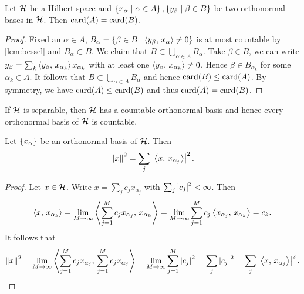 \begin{proposition}
    Let $\mathcal{H}$ be a Hilbert space and $\left\{ x_\alpha \;\middle\vert\; \alpha\in A \right\},\left\{ y_\beta \;\middle\vert\; \beta\in B \right\}$ 
    be two orthonormal bases in $\mathcal{H}$. Then $\operatorname{card}(A) = \operatorname{card}(B)$.
\end{proposition}
\begin{proof}
    Fixed an $\alpha\in A$, $B_\alpha = \left\{ \beta\in B \;\middle\vert\; \left\langle {y_\beta},\, {x_\alpha} \right\rangle\neq 0 \right\}$ 
    is at most countable by \cref{lem:bessel} and $B_\alpha\subset B$. We 
    claim that $B\subset\bigcup_{\alpha\in A}B_\alpha$. Take $\beta\in B$, 
    we can write $y_\beta = \sum_k \left\langle {y_\beta},\, {x_{\alpha_k}} \right\rangle x_{\alpha_k}$ with 
    at least one $\left\langle {y_\beta},\, {x_{\alpha_k}} \right\rangle \neq 0$. Hence $\beta\in B_{\alpha_k}$ 
    for some $\alpha_k\in A$. It follows that $B\subset\bigcup_{\alpha\in A}B_\alpha$ 
    and hence $\operatorname{card}(B)\leq \operatorname{card}(A)$. By symmetry, we have $\operatorname{card}(A)\leq \operatorname{card}(B)$ 
    and thus $\operatorname{card}(A) = \operatorname{card}(B)$.
\end{proof}
\begin{remark}
    If $\mathcal{H}$ is separable, then $\mathcal{H}$ has a countable orthonormal basis and hence 
    every orthonormal basis of $\mathcal{H}$ is countable. 
\end{remark}

\begin{proposition}
    Let $\left\{ {x_\alpha} \right\}$ be an orthonormal basis of $\mathcal{H}$. Then 
    \begin{equation*}
        \left\lVert {x} \right\rVert^2 = \sum_j\left\lvert {\left\langle {x},\, {x_{\alpha_j}} \right\rangle} \right\rvert^2.
    \end{equation*}
\end{proposition}
\begin{proof}
    Let $x\in\mathcal{H}$. Write $x = \sum_j c_jx_{\alpha_j}$ with $\sum_j \left\lvert {c_j} \right\rvert^2 < \infty$. 
    Then 
    \begin{equation*}
        \left\langle {x},\, {x_{\alpha_k}} \right\rangle = \lim_{M\to\infty}\left\langle {\sum_{j=1}^{M}c_jx_{\alpha_j}},\, {x_{\alpha_k}} \right\rangle 
        = \lim_{M\to\infty}\sum_{j=1}^{M}c_j\left\langle {x_{\alpha_j}},\, {x_{\alpha_k}} \right\rangle = c_k.
    \end{equation*}
    It follows that 
    \begin{equation*}
        \left\lVert {x} \right\rVert^2 = \lim_{M\to\infty}\left\langle {\sum_{j=1}^{M} c_jx_{\alpha_j}},\, {\sum_{j=1}^{M} c_jx_{\alpha_j}} \right\rangle
        = \lim_{M\to\infty}\sum_{j=1}^{M}\left\lvert {c_j} \right\rvert^2 = \sum_j\left\lvert {c_j} \right\rvert^2 = \sum_j\left\lvert {\left\langle {x},\, {x_{\alpha_j}} \right\rangle} \right\rvert^2.
    \end{equation*}
\end{proof}